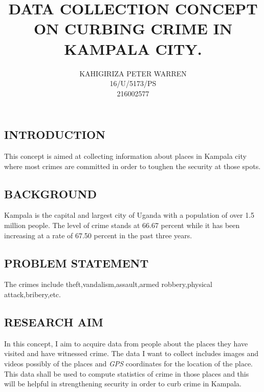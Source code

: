 \documentclass[10pt,a4paper]{report}
\author{KAHIGIRIZA PETER WARREN \\
16/U/5173/PS\\
216002577\\
}
\title{DATA COLLECTION CONCEPT ON CURBING CRIME IN KAMPALA CITY. }
\begin{document}
\begin{flushleft}

	\subsection*{INTRODUCTION}This concept is aimed at collecting information about places in Kampala city where most crimes are committed in order to toughen the security at those spots.\\
	
\subsection*{BACKGROUND}Kampala is the capital and largest city of Uganda with a population of over 1.5 million people. The level of crime stands at 66.67 percent while it has been increasing at a rate of 67.50 percent in the past three years.\\

\subsection*{PROBLEM STATEMENT}The crimes include theft,vandalism,assault,armed robbery,physical attack,bribery,etc. \\

\subsection*{RESEARCH AIM}In this concept, I aim to acquire data from people about the places they have visited and have witnessed crime. The data I want to collect includes images and videos possibly of the places and \textit{GPS} coordinates for the location of the place. This data shall be used to compute statistics of crime in those places and this will be helpful in strengthening security in order to curb crime in Kampala.
\end{flushleft}
\end{document}
